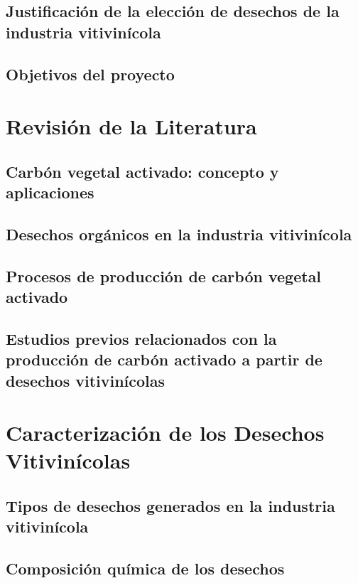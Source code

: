 \documentclass[12pt,a4paper,oneside]{book}
\begin{document}
\section{Justificación de la elección de desechos de la industria vitivinícola}

\section{Objetivos del proyecto}

\chapter{Revisión de la Literatura}

\section{Carbón vegetal activado: concepto y aplicaciones}

\section{Desechos orgánicos en la industria vitivinícola}

\section{Procesos de producción de carbón vegetal activado}

\section{Estudios previos relacionados con la producción de carbón activado a partir de desechos vitivinícolas}

\chapter{Caracterización de los Desechos Vitivinícolas}

\section{Tipos de desechos generados en la industria vitivinícola}

\section{Composición química de los desechos}
\end{document}
